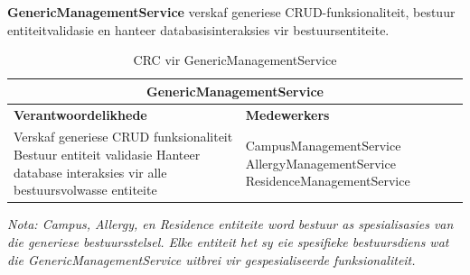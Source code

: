 \textbf{GenericManagementService} verskaf generiese CRUD-funksionaliteit, bestuur entiteitvalidasie en hanteer databasisinteraksies vir bestuursentiteite.

\vspace{1em}
\begin{table}[H]
\centering
\begin{tabular}{|p{}|p{}|}
    \hline
    \multicolumn{2}{|c|}{\textbf{GenericManagementService}} \\
    \hline
    \textbf{Verantwoordelikhede} & \textbf{Medewerkers} \\
    \hline
    Verskaf generiese CRUD funksionaliteit \newline
    Bestuur entiteit validasie \newline
    Hanteer database interaksies vir alle bestuursvolwasse entiteite
    &
    CampusManagementService \newline
    AllergyManagementService \newline
    ResidenceManagementService \\
    \hline
\end{tabular}
\caption{CRC vir GenericManagementService}
\label{tab:crc_generic_management_service}
\end{table}

\textit{Nota: Campus, Allergy, en Residence entiteite word bestuur as
spesialisasies van die generiese bestuursstelsel. Elke entiteit het sy eie
spesifieke bestuursdiens wat die GenericManagementService uitbrei vir
gespesialiseerde funksionaliteit.}
